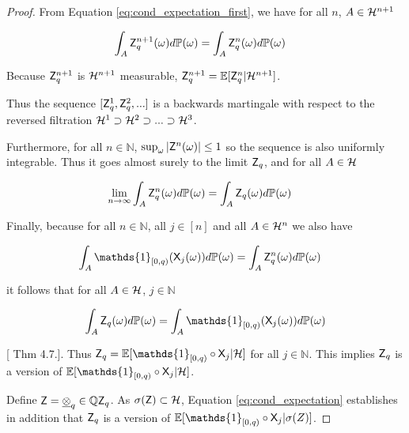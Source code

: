 \begin{proof}
From Equation \ref{eq:cond_expectation_first}, we have for all $n$, $A\in \mathcal{H}^{n+1}$

\begin{align}
    \int_{A} \mathsf{Z}_q^{n+1} (\omega) d\mathbb{P}(\omega) &= \int_{A} \mathsf{Z}_q^{n} (\omega) d\mathbb{P}(\omega)
\end{align}

Because $\mathsf{Z}_q^{n+1}$ is $\mathcal{H}^{n+1}$ measurable, $\mathsf{Z}_q^{n+1} = \mathbb{E}[\mathsf{Z}_q^{n}|\mathcal{H}^{n+1}]$.

Thus the sequence $[\mathsf{Z}^1_q,\mathsf{Z}^2_q,...]$ is a backwards martingale with respect to the reversed filtration $\mathcal{H}^1\supset\mathcal{H}^2\supset...\supset \mathcal{H}^3$.

Furthermore, for all $n\in \mathbb{N}$, $\sup_\omega|\mathsf{Z}^n(\omega)|\leq 1$ so the sequence is also uniformly integrable. Thus it goes almost surely to the limit $\mathsf{Z}_q$, and for all $A\in \mathcal{H}$

\begin{align}
    \lim_{n\to\infty} \int_A \mathsf{Z}^n_q(\omega) d\mathbb{P}(\omega) &= \int_A \mathsf{Z}_q(\omega) d\mathbb{P}(\omega)
\end{align}

Finally, because for all $n\in \mathbb{N}$, all $j\in[n]$ and all $A\in \mathcal{H}^n$ we also have

\begin{align}
    \int_A \mathds{1}_{[0,q)}(\RV{X}_j(\omega))d\prob{P}(\omega) &= \int_A \RV{Z}_q^n(\omega) d\prob{P}(\omega)
\end{align}

it follows that for all $A\in \mathcal{H}$, $j\in \mathbb{N}$

\begin{align}
    \int_A \RV{Z}_q(\omega) d\prob{P}(\omega) = \int_A \mathds{1}_{[0,q)}(\RV{X}_j(\omega))d\prob{P}(\omega)\label{eq:cond_expectation}
\end{align}

[\citet{cinlar_probability_2011} Thm 4.7.]. Thus $\RV{Z}_q = \mathbb{E}[\mathds{1}_{[0,q)}\circ\RV{X}_j|\sigalg{H}]$ for all $j\in \mathbb{N}$. This implies $\mathsf{Z}_q$ is a version of $\mathbb{E}[\mathds{1}_{[0,q)}\circ \RV{X}_j|\sigalg{H}]$.

Define $\mathsf{Z} = \underline{\otimes}_q\in \mathbb{Q} \mathsf{Z}_q$. As $\sigma(\mathsf{Z})\subset\mathcal{H}$, Equation \ref{eq:cond_expectation} establishes in addition that $\mathsf{Z}_q$ is a version of $\mathbb{E}[\mathds{1}_{[0,q)}\circ \RV{X}_j|\sigma(Z)]$. 


\end{proof}
